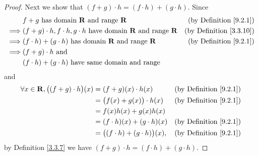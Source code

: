 \begin{proof}
    Next we show that \((f + g) \cdot h = (f \cdot h) + (g \cdot h)\).
    Since
    \begin{align*}
                 & f + g \text{ has domain } \mathbf{R} \text{ and range } \mathbf{R}                                   & \text{(by Definition \ref{9.2.1})}  \\
        \implies & (f + g) \cdot h, f \cdot h, g \cdot h  \text{ have domain } \mathbf{R} \text{ and range } \mathbf{R} & \text{(by Definition \ref{3.3.10})} \\
        \implies & (f \cdot h) + (g \cdot h)  \text{ has domain } \mathbf{R} \text{ and range } \mathbf{R}              & \text{(by Definition \ref{9.2.1})}  \\
        \implies & (f + g) \cdot h \text{ and }                                                                                               \\
                 & (f \cdot h) + (g \cdot h) \text{ have same domain and range}
    \end{align*}
    and
    \begin{align*}
        \forall x \in \mathbf{R}, \big((f + g) \cdot h\big)(x) & = (f + g)(x) \cdot h(x)                   & \text{(by Definition \ref{9.2.1})} \\
                                                       & = \big(f(x) + g(x)\big) \cdot h(x)        & \text{(by Definition \ref{9.2.1})} \\
                                                       & = f(x)h(x) + g(x)h(x)                                                          \\
                                                       & = (f \cdot h)(x) + (g \cdot h)(x)         & \text{(by Definition \ref{9.2.1})} \\
                                                       & = \big((f \cdot h) + (g \cdot h)\big)(x), & \text{(by Definition \ref{9.2.1})}
    \end{align*}
    by Definition \ref{3.3.7} we have \((f + g) \cdot h = (f \cdot h) + (g \cdot h)\).


\end{proof}
